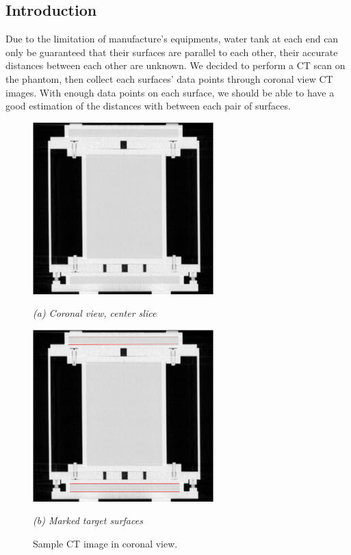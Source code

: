 
\subsection{Introduction}
Due to the limitation of manufacture's equipments, water tank at each end can only be guaranteed that their
surfaces are parallel %
to each other, their accurate distances between each other
are unknown. We decided to perform a CT scan%
on the phantom, then collect each
surfaces' data points through coronal view CT images. With enough data points on each surface, we should be
able to have a good estimation of the distances with between each pair of surfaces. %
\\

\begin{figure}[htb]
  \begin{minipage}[b]{2.75in}
    \centering
    \centerline{\mbox{\includegraphics[width=2.75in]{data_extraction/images/targets/ct_coronal_mid_slice.eps}}}
    \centerline{\emph{(a) Coronal view, center slice}}
  \end{minipage}
  \begin{minipage}[b]{2.75in}
    \centering
    \centerline{\mbox{\includegraphics[width=2.75in]{data_extraction/images/targets/ct_coronal_mid_slice_marked_surface.eps}}}
    \centerline{\emph{(b) Marked target surfaces}}
  \end{minipage}
  \caption{Sample CT image in coronal view.}
  \label{fig:ct_sample_coronal}
\end{figure}

